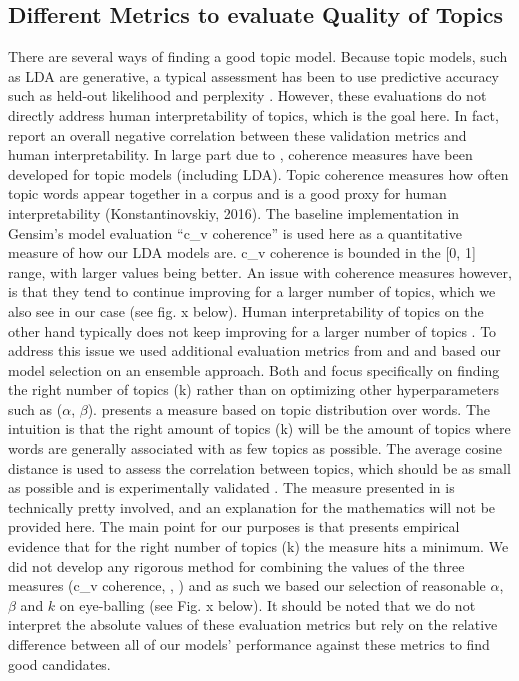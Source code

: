\documentclass{article}
\begin{document}
    \subsection{Different Metrics to evaluate Quality of Topics}
There are several ways of finding a good topic model. Because topic models, such as LDA are generative, a typical assessment has been to use predictive accuracy such as held-out likelihood and perplexity \cite{chang2009reading}. However, these evaluations do not directly address human interpretability of topics, which is the goal here. In fact,  report an overall negative correlation between these validation metrics and human interpretability. In large part due to , coherence measures have been developed for topic models (including LDA). Topic coherence measures how often topic words appear together in a corpus and is a good proxy for human interpretability (Konstantinovskiy, 2016). The baseline implementation in Gensim’s model evaluation “c\_v coherence” is used here as a quantitative measure of how our LDA models are. c\_v coherence is bounded in the [0, 1] range, with larger values being better. 
An issue with coherence measures however, is that they tend to continue improving for a larger number of topics, which we also see in our case (see fig. x below). Human interpretability of topics on the other hand typically does not keep improving for a larger number of topics \cite{chang2009reading}. To address this issue we used additional evaluation metrics from  and  and based our model selection on an ensemble approach. Both  and  focus specifically on finding the right number of topics (k) rather than on optimizing other hyperparameters such as ($\alpha$, $\beta$).  presents a measure based on topic distribution over words. The intuition is that the right amount of topics (k) will be the amount of topics where words are generally associated with as few topics as possible. The average cosine distance is used to assess the correlation between topics, which should be as small as possible and is experimentally validated \cite{cao2009density}. The measure presented in  is technically pretty involved, and an explanation for the mathematics will not be provided here. The main point for our purposes is that  presents empirical evidence that for the right number of topics (k) the measure hits a minimum. We did not develop any rigorous method for combining the values of the three measures (c\_v coherence, \cite{cao2009density}, \cite{arun2010finding}) and as such we based our selection of reasonable $\alpha$, $\beta$ and $k$ on eye-balling (see Fig. x below). 
It should be noted that we do not interpret the absolute values of these evaluation metrics but rely on the relative difference between all of our models' performance against these metrics to find good candidates. 
\end{document}
